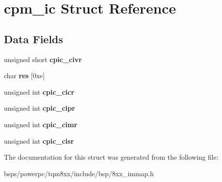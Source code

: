 \hypertarget{structcpm__ic}{}\section{cpm\+\_\+ic Struct Reference}
\label{structcpm__ic}
\subsection*{Data Fields}
\begin{DoxyCompactItemize}
\item 
\mbox{\label{structcpm__ic_a1e2113ac8f61c21d6525730748c1a930}} 
unsigned short {\bfseries cpic\+\_\+civr}
\item 
\mbox{\label{structcpm__ic_af12ba01bca3935965afff5acd0510827}} 
char {\bfseries res} \mbox{[}0xe\mbox{]}
\item 
\mbox{\label{structcpm__ic_ab475416f45df45b12ecd988631ac1854}} 
unsigned int {\bfseries cpic\+\_\+cicr}
\item 
\mbox{\label{structcpm__ic_a7d3f6bb01a8f55fe0c56cccb87fee111}} 
unsigned int {\bfseries cpic\+\_\+cipr}
\item 
\mbox{\label{structcpm__ic_a151920904ccc403fab6f0526bb613e32}} 
unsigned int {\bfseries cpic\+\_\+cimr}
\item 
\mbox{\label{structcpm__ic_ab527bf741c5ebf4973cf689c8f6a68f6}} 
unsigned int {\bfseries cpic\+\_\+cisr}
\end{DoxyCompactItemize}


The documentation for this struct was generated from the following file\+:\begin{DoxyCompactItemize}
\item 
bsps/powerpc/tqm8xx/include/bsp/8xx\+\_\+immap.\+h\end{DoxyCompactItemize}
